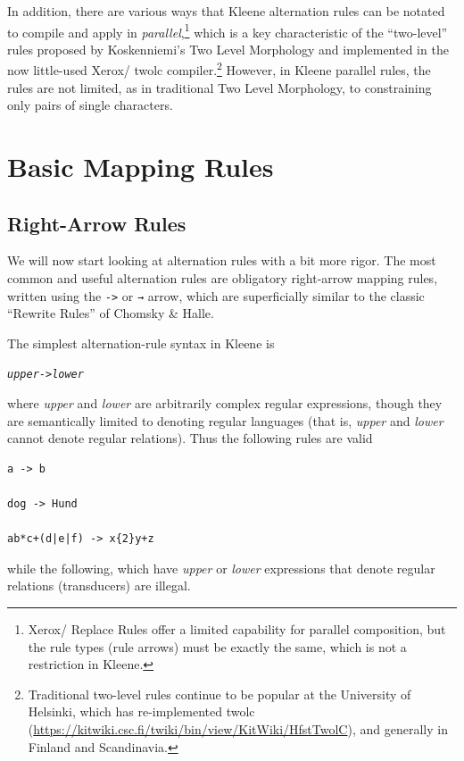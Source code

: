 In addition, there are various ways that Kleene alternation rules can be notated to compile
and apply in \emph{parallel},\footnote{Xerox/ Replace Rules offer a limited
capability for parallel composition, but the rule types (rule arrows) must be exactly the
same, which is not a restriction in Kleene.}  which is a key characteristic of the
``two-level'' rules proposed by Koskenniemi's Two Level Morphology and implemented in the
now little-used Xerox/ twolc compiler.\footnote{Traditional two-level rules
	continue to be popular at the University of Helsinki, which has re-implemented twolc
(\url{https://kitwiki.csc.fi/twiki/bin/view/KitWiki/HfstTwolC}), and generally in Finland
and Scandinavia.}  However, in Kleene parallel rules, the rules are not limited, as in
traditional Two Level Morphology, to constraining only pairs of single characters.

\section{Basic Mapping Rules}

\subsection{Right-Arrow Rules}

We will now start looking at alternation rules with a bit more rigor.  
The most common and useful alternation rules are obligatory right-arrow mapping rules, written using
the \texttt{->} or \texttt{→} arrow, which are
superficially similar to the classic ``Rewrite Rules'' of Chomsky \& Halle.

The simplest alternation-rule syntax in Kleene is

\begin{alltt}
\emph{upper} -> \emph{lower}
\end{alltt}

\noindent
where \emph{upper} and \emph{lower} are
arbitrarily complex regular expressions, though they are semantically limited to
denoting regular languages (that is, \emph{upper} and \emph{lower} cannot denote regular relations).
Thus the following rules are valid


\begin{Verbatim}
a -> b

dog -> Hund

ab*c+(d|e|f) -> x{2}y+z
\end{Verbatim}

\noindent
while the following, which have \emph{upper} or \emph{lower} expressions that denote regular relations
(transducers) are illegal.

